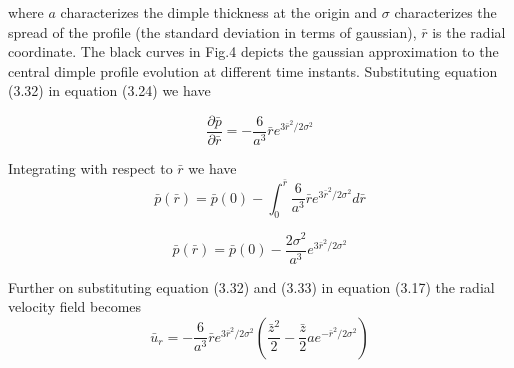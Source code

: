 \documentclass{jfm}
\begin{document}
where $a$ characterizes the dimple thickness at the origin and ${\sigma}$ characterizes the spread of the profile (the standard deviation in terms of gaussian), $\bar{r}$ is the radial coordinate.
The black curves in Fig.4 depicts the gaussian approximation to the central dimple profile evolution at different time instants.
Substituting equation (3.32) in equation (3.24) we have

\begin{equation}
    \frac{{\partial}\bar{p}}{{\partial}\bar{r}} = -\frac{6}{a^3}\bar{r}e^{3\bar{r}^2/2{\sigma}^2}
\end{equation}

Integrating with respect to $\bar{r}$ we have
\begin{equation}
    \bar{p}(\bar{r})=\bar{p}(0) - \int_0^{\bar{r}}\frac{6}{a^3}\bar{r}e^{3\bar{r}^2/2{\sigma}^2}d\bar{r}
\end{equation}

\begin{equation}
    \bar{p}(\bar{r})=\bar{p}(0) - \frac{2{\sigma}^2}{a^3}e^{3\bar{r}^2/2{\sigma}^2}
\end{equation}

Further on substituting equation (3.32) and (3.33) in equation (3.17) the radial velocity field becomes
\begin{equation}
     {\bar{u}}_r = -\frac{6}{a^3}\bar{r}e^{3\bar{r}^2/2{\sigma}^2}\left(\frac{\bar{z}^2}{2}-\frac{\bar{z}}{2}ae^{-\bar{r}^2/2{\sigma}^2}\right)
\end{equation}
\end{document}
